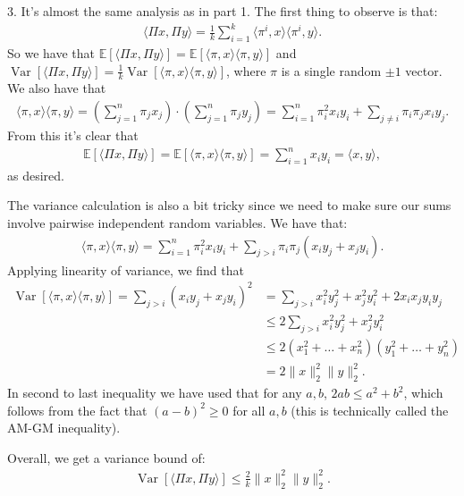 \documentclass[11pt]{article}
\newcommand{\E}{\mathbb{E}}
\DeclareMathOperator{\Var}{Var}
\begin{document}
\vspace{.5em}
3. It's almost the same analysis as in part 1. The first thing to observe is that:
\begin{align*}
	\langle \Pi x, \Pi y\rangle  = \frac{1}{k}\sum_{i=1}^k \langle \pi^i, x\rangle \langle \pi^i, y\rangle. 
\end{align*}
So we have that $\E[\langle \Pi x, \Pi y\rangle] = \E[\langle \pi, x\rangle \langle \pi, y\rangle]$ and $\Var[\langle \Pi x, \Pi y\rangle] = \frac{1}{k}\Var[\langle \pi, x\rangle \langle \pi, y\rangle]$, where $\pi$ is a single random $\pm 1$ vector. We also have that 
\begin{align*}
	\langle \pi, x\rangle \langle \pi, y\rangle = \left(\sum_{j=1}^n \pi_j x_j \right)\cdot  \left(\sum_{j=1}^n \pi_j y_j \right) = \sum_{i=1}^n\pi_i^2 x_iy_i + \sum_{j\neq i}\pi_i\pi_j x_iy_j.
\end{align*}
From this it's clear that 
\begin{align*}
		\E[\langle \Pi x, \Pi y\rangle]  = \E[\langle \pi, x\rangle \langle \pi, y\rangle] = \sum_{i=1}^n x_iy_i  = \langle x,y\rangle, 
\end{align*}
as desired. 

The variance calculation is also a bit tricky since we need to make sure our sums involve pairwise independent random variables. We have that: 
\begin{align*}
	\langle \pi, x\rangle \langle \pi, y\rangle = \sum_{i=1}^n\pi_i^2 x_iy_i + \sum_{j> i}\pi_i\pi_j (x_iy_j + x_jy_i).
\end{align*}
Applying linearity of variance, we find that 
\begin{align*}
	\Var[\langle \pi, x\rangle \langle \pi, y\rangle] = \sum_{j> i} (x_iy_j + x_jy_i)^2 &= \sum_{j> i} x_i^2y_j^2 + x_j^2y_i^2  + 2 x_ix_jy_iy_j \\
	&\leq 2 \sum_{j> i} x_i^2y_j^2 + x_j^2y_i^2 \\
	& \leq 2(x_1^2 + \ldots + x_n^2)(y_1^2 + \ldots + y_n^2) \\
	&= 2 \|x\|_2^2 \|y\|_2^2.
\end{align*}
In second to last inequality we have used that for any $a,b$, $2ab \leq a^2 + b^2$, which follows from the fact that $(a-b)^2 \geq 0$ for all $a,b$ (this is technically called the AM-GM inequality).

Overall, we get a variance bound of:
\begin{align*}
	\Var[\langle \Pi x, \Pi y\rangle] \leq \frac{2}{k}\|x\|_2^2 \|y\|_2^2.
\end{align*}
\end{document}

